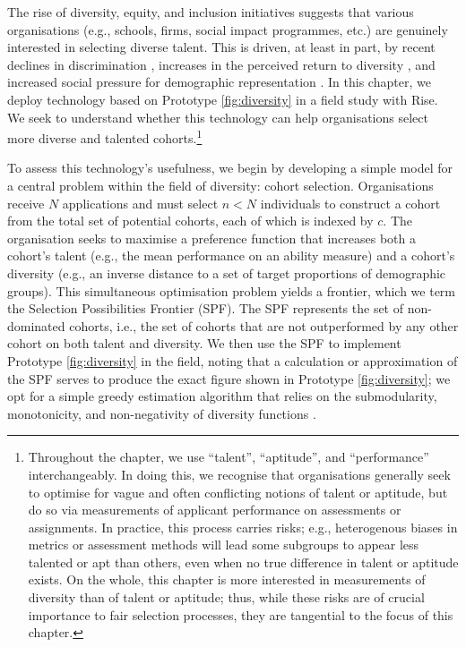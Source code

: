 The rise of diversity, equity, and inclusion initiatives suggests that various organisations (e.g., schools, firms, social impact programmes, etc.) are genuinely interested in selecting diverse talent. This is driven, at least in part, by recent declines in discrimination \cite{hsieh2019allocation}, increases in the perceived return to diversity \cite{deming2017growing, page_diversity_2017, noray2023systemic}, and increased social pressure for demographic representation \cite{minkin2023diversity}. In this chapter, we deploy technology based on Prototype \ref{fig:diversity} in a field study with Rise. We seek to understand whether this technology can help organisations select more diverse and talented cohorts.\footnote{Throughout the chapter, we use ``talent'', ``aptitude'', and ``performance'' interchangeably. In doing this, we recognise that organisations generally seek to optimise for vague and often conflicting notions of talent or aptitude, but do so via measurements of applicant performance on assessments or assignments. In practice, this process carries risks; e.g., heterogenous biases in metrics or assessment methods will lead some subgroups to appear less talented or apt than others, even when no true difference in talent or aptitude exists. On the whole, this chapter is more interested in measurements of diversity than of talent or aptitude; thus, while these risks are of crucial importance to fair selection processes, they are tangential to the focus of this chapter.}

To assess this technology's usefulness, we begin by developing a simple model for a central problem within the field of diversity: cohort selection. Organisations receive $N$ applications and must select $n<N$ individuals to construct a cohort from the total set of potential cohorts, each of which is indexed by $c$. The organisation seeks to maximise a preference function that increases both a cohort's talent (e.g., the mean performance on an ability measure) and a cohort's diversity (e.g., an inverse distance to a set of target proportions of demographic groups). This simultaneous optimisation problem yields a frontier, which we term the Selection Possibilities Frontier (SPF). The SPF represents the set of non-dominated cohorts, i.e., the set of cohorts that are not outperformed by any other cohort on both talent and diversity. We then use the SPF to implement Prototype \ref{fig:diversity} in the field, noting that a calculation or approximation of the SPF serves to produce the exact figure shown in Prototype \ref{fig:diversity}; we opt for a simple greedy estimation algorithm that relies on the submodularity, monotonicity, and non-negativity of diversity functions \cite{krause2014submodular, huppenkothen2020entrofy}.

